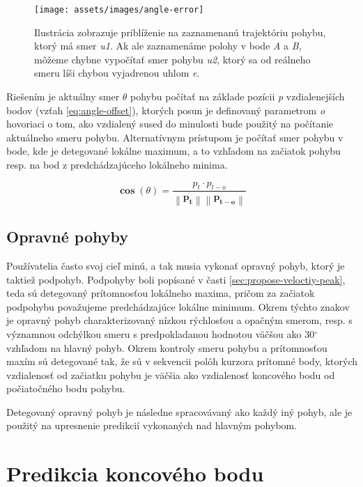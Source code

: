 \begin{figure}[h]
\centering
\texttt{[image: assets/images/angle-error]}
\caption{Ilustrácia zobrazuje priblíženie na zaznamenanú trajektóriu pohybu, ktorý má smer \emph{u1}. Ak ale zaznamenáme polohy v bode \emph{A} a \emph{B}, môžeme chybne vypočítať smer pohybu \emph{u2}, ktorý sa od reálneho smeru líši chybou vyjadrenou uhlom \emph{e}. \label{fig:angle-error}}
\end{figure}

Riešením je aktuálny smer $\theta$ pohybu počítať na základe pozícii \emph{p} vzdialenejších bodov (vzťah \ref{eq:angle-offset}), ktorých posun je definovaný parametrom \emph{o} hovoriaci o tom, ako vzdialený sused do minulosti bude použitý na počítanie aktuálneho smeru pohybu. Alternatívnym prístupom je počítať smer pohybu v bode, kde je detegované lokálne maximum, a to vzhľadom na začiatok pohybu resp. na bod z predchádzajúceho lokálneho minima.

\begin{equation}
{\displaystyle \mathbf \cos \left (\theta  \right ) = \frac{{p_{t}} \cdot {p_{t-o}}}{\left\|\mathbf {p_{t}} \right\|\left\|\mathbf {p_{t-o}} \right\|}}
\label{eq:angle-offset}
\end{equation}

\subsection{Opravné pohyby}
Používatelia často svoj cieľ minú, a tak musia vykonať opravný pohyb, ktorý je taktiež podpohyb. Podpohyby boli popísané v časti \ref{sec:propose-veloctiy-peak}, teda sú detegovaný prítomnosťou lokálneho maxima, pričom za začiatok podpohybu považujeme predchádzajúce lokálne minimum. Okrem týchto znakov je opravný pohyb  charakterizovaný nízkou rýchlosťou a opačným smerom, resp. s významnou odchýlkou smeru s predpokladanou hodnotou väčšou ako 30$^{\circ}$ vzhľadom na hlavný pohyb. Okrem kontroly smeru pohybu a prítomnosťou maxím sú detegované tak, že sú v sekvencii polôh kurzora prítomné body, ktorých vzdialenosť od začiatku pohybu je väčšia ako vzdialenosť koncového bodu od počiatočného bodu pohybu.

Detegovaný opravný pohyb je následne spracovávaný ako každý iný pohyb, ale je použitý na upresnenie predikcií vykonaných nad hlavným pohybom.

\section{Predikcia koncového bodu}\label{sec:prediction-proposal}

